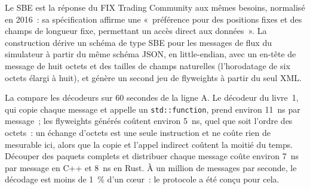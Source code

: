 Le SBE est la réponse du FIX Trading Community aux mêmes besoins, normalisé en 2016~: sa spécification affirme une «~préférence
pour des positions fixes et des champs de longueur fixe, permettant un accès direct aux données~». La construction dérive un schéma de type SBE pour
les messages de flux du simulateur à partir du même schéma JSON, en little-endian, avec un en-tête de message de huit octets et des tailles de champs naturelles
(l'horodatage de six octets élargi à huit), et génère un second jeu de flyweights à partir du seul XML.

\label{lst:ll:protocols-ii-binary-exchange-protocols:sbe}

La  compare les décodeurs sur 60 secondes de la ligne A. Le décodeur du livre~1,
qui copie chaque message et appelle un \texttt{std::function}, prend environ \qty{11}{\nano\second} par message~; les flyweights générés
coûtent environ \qty{5}{\nano\second}, quel que soit l'ordre des octets~: un échange d'octets est une seule instruction et ne coûte rien
de mesurable ici, alors que la copie et l'appel indirect coûtent la moitié du temps. Découper des paquets complets et distribuer chaque message coûte
environ \qty{7}{\nano\second} par message en C++ et \qty{8}{\nano\second} en Rust. À un million de messages par seconde, le décodage est
moins de 1~\% d'un cœur~: le protocole a été conçu pour cela.

